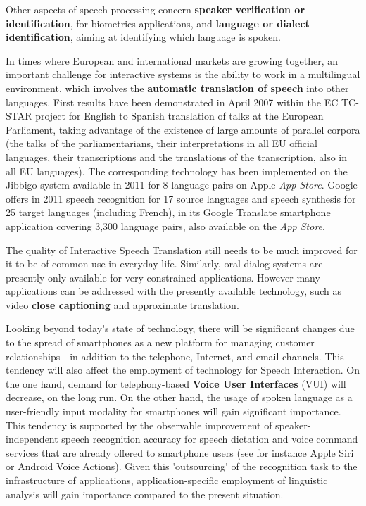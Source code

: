 \begin{multicols}{2}
Other aspects of speech processing concern {\bf speaker verification or
identification}, for biometrics applications, and {\bf language or dialect
identification}, aiming at identifying which language is spoken.

In times where European and international markets are growing
together, an important challenge for interactive systems is the
ability to work in a multilingual environment, which involves the
{\bf automatic translation of speech} into other languages. First results
have been demonstrated in April 2007 within the EC TC-STAR\cite{tcstarurl} project
for English to Spanish translation of talks at the European
Parliament, taking advantage of the existence of large amounts of
parallel corpora (the talks of the parliamentarians, their
interpretations in all EU official languages, their transcriptions and
the translations of the transcription, also in all EU languages). The
corresponding technology has been implemented on the Jibbigo\cite{jibbigo} system
available in 2011 for 8 language pairs on Apple {\em App Store}. Google offers
in 2011 speech recognition for 17 source languages and speech synthesis
for 25 target languages (including French), in its Google Translate
smartphone application covering 3,300 language pairs, also available
on the {\em App Store}.

The quality of Interactive Speech Translation still needs to be much
improved for it to be of common use in everyday life. Similarly, oral
dialog systems are presently only available for very constrained
applications. However many applications can be addressed with the
presently available technology, such as video {\bf close captioning}
and approximate translation.

Looking beyond today{\mbox '}s state of technology, there will be
significant changes due to the spread of smartphones as a new platform
for managing customer relationships - in addition to the telephone,
Internet, and email channels. This tendency will also affect the
employment of technology for Speech Interaction. On the one hand,
demand for telephony-based {\bf Voice User Interfaces} (VUI) will
decrease, on the long run. On the other hand, the usage of spoken
language as a user-friendly input modality for smartphones will gain
significant importance. This tendency is supported by the observable
improvement of speaker-independent speech recognition accuracy for
speech dictation and voice command services that are already offered
to smartphone users (see for instance Apple Siri or Android Voice
Actions). Given this {\mbox '}outsourcing{\mbox '} of the recognition
task to the infrastructure of applications, application-specific
employment of linguistic analysis will gain importance compared to the
present situation.


\end{multicols}
